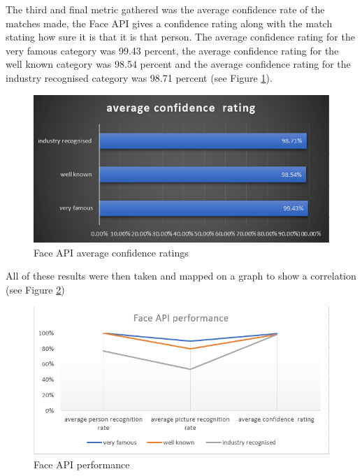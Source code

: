 \documentclass[12pt,a4paper]{article}
\begin{document}
The third and final metric gathered was the average confidence rate of the matches made, the Face API gives a confidence rating along with the match stating how sure it is that it is that person. The average confidence rating for the very famous category was 99.43 percent, the average confidence rating for the well known category was 98.54 percent and the average confidence rating for the industry recognised category was 98.71 percent (see Figure \ref{fer3}). 

\begin{figure}[!ht]
    \centering
    \includegraphics[width=1.0\textwidth]{Figs/faceevalr3.PNG} 
    \caption{Face API average confidence ratings} 
    \label{fer3}
\end{figure} 

All of these results were then taken and mapped on a graph to show a correlation (see Figure \ref{fer4}) 

\begin{figure}[!ht]
    \centering
    \includegraphics[width=1.0\textwidth]{Figs/faceevalr4.PNG} 
    \caption{Face API performance} 
    \label{fer4}
\end{figure} 
\end{document}
